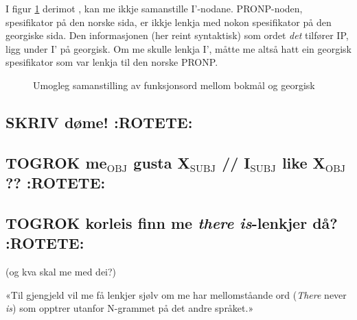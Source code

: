 \documentclass[11pt,a4paper,oneside,draft]{book}
\begin{document}
I figur \ref{fig:ikkjesub} derimot \citep{mrs-suite}, kan me ikkje
samanstille I'-nodane. PRONP-noden, spesifikator på den norske sida,
er ikkje lenkja med nokon spesifikator på den georgiske sida. Den
informasjonen (her reint syntaktisk) som ordet \emph{det} tilfører IP, ligg
under I' på georgisk. Om me skulle lenkja I', måtte me altså hatt ein
georgisk spesifikator som var lenkja til den norske PRONP.

\begin{figure}[htp]
 \vfill{} %
\caption{Umogleg samanstilling av funksjonsord mellom bokmål og georgisk}
 \label{fig:ikkjesub}
\end{figure}

\subsection{\textbf{SKRIV} døme! \textbf{:ROTETE:}}
\label{sec-3.9.1}

\subsection{\textbf{TOGROK} me$_{\mathrm{OBJ}}$ gusta X$_{\mathrm{SUBJ}}$ // I$_{\mathrm{SUBJ}}$ like X$_{\mathrm{OBJ}}$ ?? \textbf{:ROTETE:}}
\label{sec-3.9.2}

\subsection{\textbf{TOGROK} korleis finn me \emph{there is}-lenkjer då? \textbf{:ROTETE:}}
\label{sec-3.9.3}

(og kva skal me med dei?)

«Til gjengjeld vil me få lenkjer sjølv om me har mellomståande ord
(\emph{There} never \emph{is}) som opptrer utanfor N-grammet på det andre
språket.»
\end{document}
